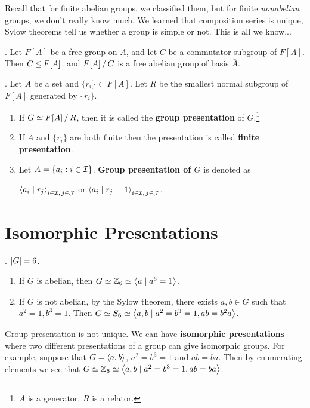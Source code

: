 
Recall that for finite abelian groups, we classified them, but for finite \textit{nonabelian} groups, we don't really know much. We learned that composition series is unique, Sylow theorems tell us whether a group is simple or not. This is all we know...

\ex. Let \(F[A]\) be a free group on \(A\), and let \(C\) be a commutator subgroup of \(F[A]\). Then \(C \unlhd F[A]\), and \(F[A] \operatorname{/} C\) is a free abelian group of basis \(\bar{A}\).

. Let \(A\) be a set and \(\{r_i\} \subset F[A]\). Let \(R\) be the smallest normal subgroup of \(F[A]\) generated by \(\{r_i\}\).
\begin{enumerate}
    \item If \(G \simeq F[A] \operatorname{/} R\), then it is called the \textbf{group presentation} of \(G\).\footnote{\(A\) is a generator, \(R\) is a relator.}
    \item If \(A\) and \(\{r_i\}\) are both finite then the presentation is called \textbf{finite presentation}.
    \item Let \(A = \{a_i : i \in \mathcal{I}\}\). \textbf{Group presentation of \(G\)} is denoted as
          \begin{center}
              \(\left\langle a_i \mid r_j \right\rangle_{i \in \mathcal{I},\, j \in \mathcal{J}}\) \quad or \quad \(\left\langle a_i \mid r_j = 1 \right\rangle_{i \in \mathcal{I},\, j \in \mathcal{J}}\).
          \end{center}
\end{enumerate}

\section*{Isomorphic Presentations}

\ex. \(\left| G \right| = 6\).
\begin{enumerate}
    \item If \(G\) is abelian, then \(G \simeq \mathbb{Z}_6 \simeq \left\langle a \mid a^6 = 1 \right\rangle\).
    \item If \(G\) is not abelian, by the Sylow theorem, there exists \(a, b \in G\) such that \(a^2 = 1, b^3 = 1\). Then \(G \simeq S_6 \simeq \left\langle a, b \mid a^2 = b^3 = 1, ab = b^2a \right\rangle\).
\end{enumerate}

\rmk Group presentation is not unique. We can have \textbf{isomorphic presentations} where two different presentations of a group can give isomorphic groups. For example, suppose that \(G = \left\langle a, b \right\rangle\), \(a^2 = b^3 = 1\) and \(ab = ba\). Then by enumerating elements we see that \(G \simeq \mathbb{Z}_6 \simeq \left\langle a, b \mid a^2 = b^3 = 1, ab = ba \right\rangle\).

